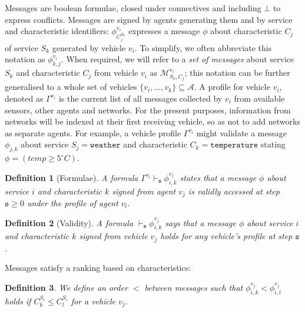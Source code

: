 \documentclass[compsoc, conference, letterpaper, 10pt, times]{IEEEtran}
\newtheorem{definition}{Definition}
\begin{document}
Messages are boolean formulae, closed under connectives and including $\bot$ to express conflicts. Messages are signed by agents generating them and by service and characteristic identifiers: $\phi^{v_{i}}_{C^{S_{k}}_{j}}$ expresses a  message $\phi$ about characteristic $C_j$ of service $S_k$  generated by vehicle $v_{i}$.  To simplify, we often abbreviate this notation as $\phi^{v_{i}}_{k,j}$.  When required, we will refer to a \textit{set of messages} about service $S_{k}$ and characteristic $C_{j}$ from vehicle $v_{i}$ as $\mathcal{M}^{v_{i}}_{S_{k}, C_{j}}$; this notation can be further generalised to a whole set of vehicles $\{v_{i}, \dots, v_{k}\} \subseteq  \mathcal{A}$. 
%
A profile for vehicle $v_{i}$, denoted as $\Gamma^{v_{i}}$ is the current list of all messages collected by $v_{i}$ from available sensors, other agents and networks. For the present purposes, information from networks will be indexed at their first receiving vehicle, so as not to add networks as separate agents. For example, a vehicle profile $\Gamma^{v_{i}}$ might validate a message $\phi_{j,k}$ about service $S_{j}=\mathtt{weather}$ and characteristic $C_{k}=\mathtt{temperature}$ stating $\phi= (temp \geq 5^\circ C)$.


\begin{definition}[Formulae]
A formula $\Gamma^{v_l} \vdash_{\mathtt{s}} \phi^{v_{j}}_{i,k}$ states that a message $\phi$ about service $i$ and characteristic $k$ signed from agent $v_{j}$  is validly accessed at step $\mathtt{s}\geq 0$ under the profile of agent $v_{l}$.
\end{definition}

\begin{definition}[Validity]
A formula $\vdash_{\mathtt{s}} \phi^{v_{j}}_{i,k}$ says that a message $\phi$  about service $i$ and characteristic $k$ signed from vehicle $v_{j}$ holds for \textit{any} vehicle's profile at step $\mathtt{s}$.
\end{definition}

Messages satisfy a ranking based on characteristics:

\begin{definition}\label{def:dependencypackages}
We define an order $<$ between messages such that $\phi^{v_{j}}_{i,k}<\phi^{v_{j}}_{i,l}$ holds if $C^{S_{i}}_{k}\leq C^{S_{i}}_{l}$ for a vehicle $v_{j}$.
%
\end{definition}
\end{document}
